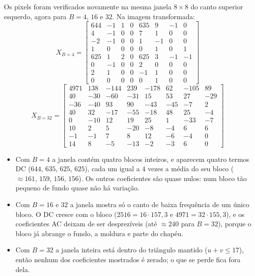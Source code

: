 \documentclass[11pt,a4paper]{article}
\begin{document}
Os pixels foram verificados novamente na mesma janela $8\times8$ do canto superior
esquerdo, agora para $B=4$, $16$ e $32$. Na imagem transformada:
\[
X_{B=4} = \begin{bmatrix}
644 & -1 & 1 & 0 & 635 & 9 & -1 & 0\\
4 & -1 & 0 & 0 & 7 & 1 & 0 & 0\\
-2 & -1 & 0 & 0 & 1 & -1 & 0 & 0\\
1 & 0 & 0 & 0 & 0 & 1 & 0 & 1\\
625 & 1 & 2 & 0 & 625 & 3 & -1 & -1\\
0 & -1 & 0 & 0 & 2 & 0 & 0 & 0\\
2 & 1 & 0 & 0 & -1 & 1 & 0 & 0\\
0 & 0 & 0 & 0 & 0 & 1 & 0 & 0
\end{bmatrix}
\]
\[
X_{B=32} = \begin{bmatrix}
4971 & 138 & -144 & 239 & -178 & 62 & -105 & 89\\
40 & -30 & -60 & -31 & 15 & 53 & 27 & -29\\
-36 & -40 & 93 & 90 & -43 & -45 & -7 & 2\\
40 & 32 & -17 & -55 & -18 & 48 & 25 & -4\\
0 & -10 & 12 & 19 & 25 & 1 & -33 & -7\\
10 & 2 & 5 & -20 & -8 & -4 & 6 & 6\\
-1 & -1 & 7 & 8 & 12 & -6 & -4 & 0\\
14 & 8 & -5 & -13 & -2 & -3 & 6 & 0
\end{bmatrix}
\]

\begin{itemize}\itemsep0pt
  \item Com $B=4$ a janela contém quatro blocos inteiros, e aparecem quatro termos DC
        ($644$, $635$, $625$, $625$), cada um igual a $4$ vezes a média do seu bloco
        ($\approx161$, $159$, $156$, $156$). Os outros coeficientes são quase nulos:
        num bloco tão pequeno de fundo quase não há variação.
  \item Com $B=16$ e $32$ a janela mostra só o canto de baixa frequência de um único
        bloco. O DC cresce com o bloco ($2516 = 16\cdot157{,}3$ e
        $4971 = 32\cdot155{,}3$), e os coeficientes AC deixam de ser desprezíveis
        (até $\approx240$ para $B=32$), porque o bloco já abrange o fundo, a moldura e
        parte do chapéu.
  \item Com $B=32$ a janela inteira está dentro do triângulo mantido ($u+v\le17$), então
        nenhum dos coeficientes mostrados é zerado; o que se perde fica fora dela.
\end{itemize}
\end{document}

